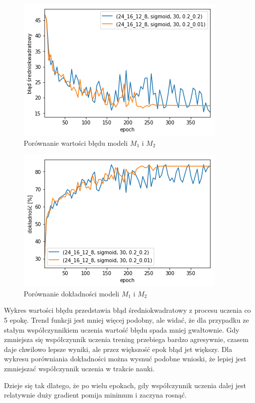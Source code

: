     \begin{figure}[h]
        \centering
        \includegraphics[scale=0.8]{./img/lr-error.png}
        \caption{Porównanie wartości błędu modeli $M_1$ i $M_2$}
    \end{figure}

    \begin{figure}[h]
        \centering
        \includegraphics[scale=0.8]{././img/lr-accuracy.png}
        \caption{Porównanie dokładności modeli $M_1$ i $M_2$}
    \end{figure}

    Wykres wartości błędu przedstawia błąd średniokwadratowy z procesu uczenia co 5 epokę.
    Trend funkcji jest mniej więcej podobny, ale widać, że dla przypadku ze stałym współczynnikiem uczenia wartość błędu spada mniej gwałtownie.
    Gdy zmniejsza się współczynnik uczenia trening przebiega bardzo agresywnie, czasem daje chwilowo lepsze wyniki, ale przez większość epok błąd jet większy.
    Dla wykresu porówniania dokładności można wysnuć podobne wnioski, że lepiej jest zmniejszać współczynnik uczenia w trakcie nauki.

    Dzieje się tak dlatego, że po wielu epokach, gdy współczynnik uczenia dalej jest relatywnie duży gradient pomija minimum i zaczyna rosnąć.

